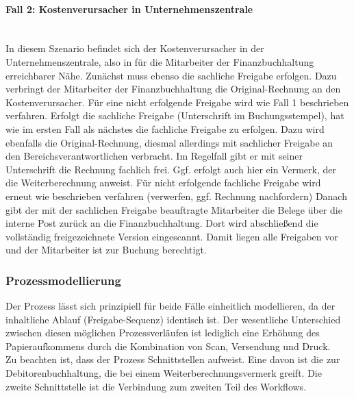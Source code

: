 \paragraph{Fall 2: Kostenverursacher in Unternehmenszentrale}
~\\
In diesem Szenario befindet sich der Kostenverursacher in der Unternehmenszentrale, also in für die Mitarbeiter der Finanzbuchhaltung erreichbarer Nähe.
Zunächst muss ebenso die sachliche Freigabe erfolgen.
Dazu verbringt der Mitarbeiter der Finanzbuchhaltung die Original-Rechnung an den Kostenverursacher.
Für eine nicht erfolgende Freigabe wird wie Fall 1 beschrieben verfahren.
Erfolgt die sachliche Freigabe (Unterschrift im Buchungsstempel), hat wie im ersten Fall als nächstes die fachliche Freigabe zu erfolgen.
Dazu wird ebenfalls die Original-Rechnung, diesmal allerdings mit sachlicher Freigabe an den Bereichsverantwortlichen verbracht.
Im Regelfall gibt er mit seiner Unterschrift die Rechnung fachlich frei.
Ggf. erfolgt auch hier ein Vermerk, der die Weiterberechnung anweist.
Für nicht erfolgende fachliche Freigabe wird erneut wie beschrieben verfahren (verwerfen, ggf. Rechnung nachfordern)
Danach gibt der mit der sachlichen Freigabe beauftragte Mitarbeiter die Belege über die interne Post zurück an die Finanzbuchhaltung.
Dort wird abschließend die vollständig freigezeichnete Version eingescannt.
Damit liegen alle Freigaben vor und der Mitarbeiter ist zur Buchung berechtigt.

\subsubsection{Prozessmodellierung}
Der Prozess lässt sich prinzipiell für beide Fälle einheitlich modellieren, da der inhaltliche Ablauf (Freigabe-Sequenz) identisch ist.
Der wesentliche Unterschied zwischen diesen möglichen Prozessverläufen ist lediglich eine Erhöhung des Papieraufkommens durch die Kombination von Scan, Versendung und Druck.\\
Zu beachten ist, dass der Prozess Schnittstellen aufweist.
Eine davon ist die zur Debitorenbuchhaltung, die bei einem Weiterberechnungsvermerk greift. 
Die zweite Schnittstelle ist die Verbindung zum zweiten Teil des Workflows.\\


